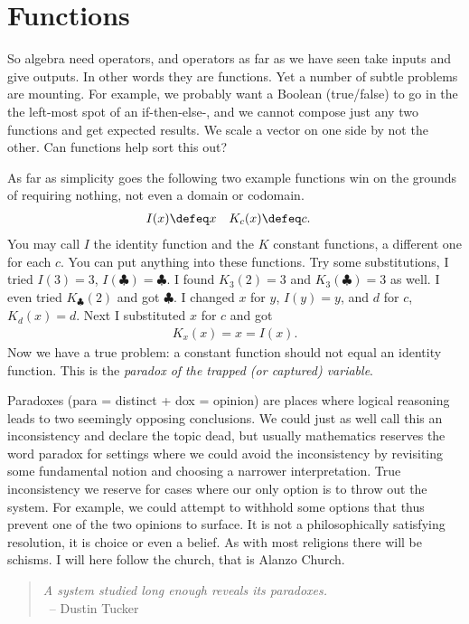 
\chapter{Functions}
So algebra need operators, and operators as far as we have seen take 
inputs and give outputs.  In other words they are functions.  
Yet a number of subtle problems are 
mounting.  For example, we probably want a Boolean (true/false) to 
go in the the left-most spot of an if-then-else-, and we cannot compose 
just any two functions and get expected results.  We scale a vector on one side 
by not the other.  Can functions help sort this out?



As far as simplicity goes the following two example functions win 
on the grounds of requiring nothing, not even a domain or codomain.
\begin{align*}
    I(x) & \defeq x & 
    K_c(x) & \defeq c.
\end{align*}
You may call $I$ the identity function and the $K$ constant functions,
a different one for each $c$.  You can put anything into these functions.
Try some substitutions, I tried $I(3)=3$, $I(\clubsuit)=\clubsuit$.
I found $K_3(2)=3$ and $K_3(\clubsuit)=3$ as well.  I even tried 
$K_{\clubsuit}(2)$ and got $\clubsuit$.  I changed $x$ for $y$, 
$I(y)=y$, and $d$ for $c$, $K_d(x)=d$. Next I substituted $x$ for $c$ and got
\begin{align*}
    K_x(x)=x=I(x).
\end{align*}
Now we have a true problem: a constant function should not equal 
an identity function.  This is the \emph{paradox of the trapped (or captured) variable}.


Paradoxes (para = distinct + dox = opinion) are places where logical reasoning
leads to two seemingly opposing conclusions.  We could just as well call this an
inconsistency and declare the topic dead, but usually mathematics reserves the
word paradox for settings where we could avoid the inconsistency by revisiting
some fundamental notion and choosing a narrower interpretation.  True
inconsistency we reserve for cases where our only option is to throw out the
system.  For example, we could attempt to withhold some options that thus
prevent one of the two opinions to surface.  It is not a philosophically
satisfying resolution, it is choice or even a belief. As with most religions there
will be schisms.  I will here follow the church, that is Alanzo Church.

\begin{quote}
\emph{A system studied long enough reveals its paradoxes.}\\
~\hfill-- Dustin Tucker
\end{quote}

